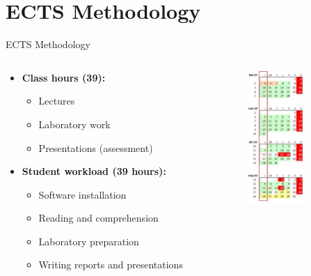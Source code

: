\section{ECTS Methodology}
\begin{frame}{ECTS Methodology}
  \begin{columns}
    \begin{column}{0.5\textwidth}
      \begin{itemize}
        \item \textbf{Class hours (39):}
        \begin{itemize}
          \item Lectures
          \item Laboratory work
          \item Presentations (assessment)
        \end{itemize}
        \item \textbf{Student workload (39 hours):}
        \begin{itemize}
          \item Software installation
          \item Reading and comprehension
          \item Laboratory preparation
          \item Writing reports and presentations
        \end{itemize}
      \end{itemize}
    \end{column}
    \begin{column}{0.5\textwidth}
      \includegraphics[height=5cm]{trainingmaterials/presentation/semester.jpg}  
    \end{column}
   \end{columns}
\end{frame}

